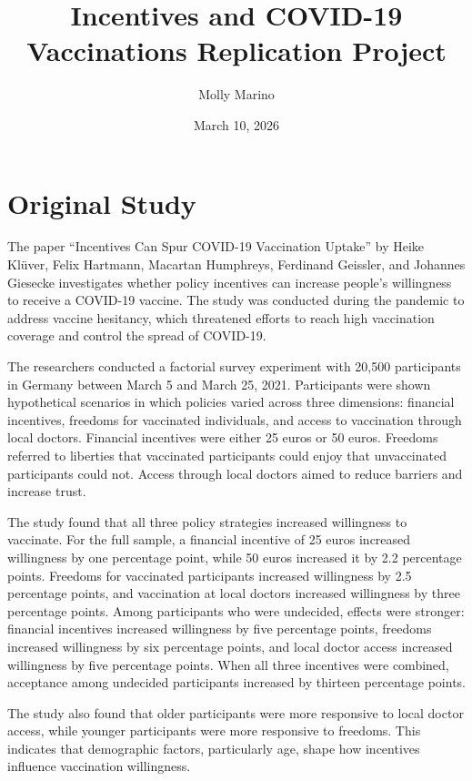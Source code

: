\documentclass[12pt]{article}
\title{Incentives and COVID-19 Vaccinations Replication Project}
\author{Molly Marino}
\date{March 10, 2026}
\begin{document}
	
	\maketitle
	
	\tableofcontents
	\newpage
	
	\section{Original Study}
	
	The paper ``Incentives Can Spur COVID-19 Vaccination Uptake'' by Heike Klüver, Felix Hartmann, Macartan Humphreys, Ferdinand Geissler, and Johannes Giesecke investigates whether policy incentives can increase people’s willingness to receive a COVID-19 vaccine. The study was conducted during the pandemic to address vaccine hesitancy, which threatened efforts to reach high vaccination coverage and control the spread of COVID-19.
	
	The researchers conducted a factorial survey experiment with 20,500 participants in Germany between March 5 and March 25, 2021. Participants were shown hypothetical scenarios in which policies varied across three dimensions: financial incentives, freedoms for vaccinated individuals, and access to vaccination through local doctors. Financial incentives were either 25 euros or 50 euros. Freedoms referred to liberties that vaccinated participants could enjoy that unvaccinated participants could not. Access through local doctors aimed to reduce barriers and increase trust.
	
	The study found that all three policy strategies increased willingness to vaccinate. For the full sample, a financial incentive of 25 euros increased willingness by one percentage point, while 50 euros increased it by 2.2 percentage points. Freedoms for vaccinated participants increased willingness by 2.5 percentage points, and vaccination at local doctors increased willingness by three percentage points. Among participants who were undecided, effects were stronger: financial incentives increased willingness by five percentage points, freedoms increased willingness by six percentage points, and local doctor access increased willingness by five percentage points. When all three incentives were combined, acceptance among undecided participants increased by thirteen percentage points.
	
	The study also found that older participants were more responsive to local doctor access, while younger participants were more responsive to freedoms. This indicates that demographic factors, particularly age, shape how incentives influence vaccination willingness.
	
\end{document}
